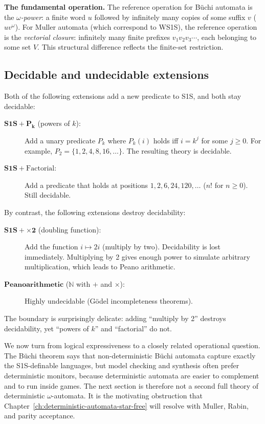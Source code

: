 \medskip\noindent
\textbf{The fundamental operation.}  The reference operation for Büchi
automata is the \emph{$\omega$-power}: a finite word $u$ followed by
infinitely many copies of some suffix $v$ ($uv^\omega$).  For Muller
automata (which correspond to WS1S), the reference operation is the
\emph{vectorial closure}: infinitely many finite prefixes $v_1 v_2 v_3
\cdots$, each belonging to some set $V$.  This structural difference
reflects the finite-set restriction.

\subsection{Decidable and undecidable extensions}

Both of the following extensions add a new predicate to S1S, and both
stay decidable:

\begin{description}
  \item[$\mathbf{S1S + P_k}$ (powers of $k$):]
        Add a unary predicate $P_k$ where $P_k(i)$ holds iff $i = k^j$
        for some $j \geq 0$.  For example, $P_2 = \{1, 2, 4, 8, 16,
        \ldots\}$.  The resulting theory is decidable.
  \item[$\mathbf{S1S + \mathrm{Factorial}}$:]
        Add a predicate that holds at positions $1, 2, 6, 24, 120, \ldots$
        ($n!$ for $n \geq 0$).  Still decidable.
\end{description}

By contrast, the following extensions destroy decidability:

\begin{description}
  \item[$\mathbf{S1S + \times 2}$ (doubling function):]
        Add the function $i \mapsto 2i$ (multiply by two).  Decidability
        is lost immediately.  Multiplying by 2 gives enough power to
        simulate arbitrary multiplication, which leads to Peano arithmetic.
  \item[$\mathbf{Peano arithmetic}$ ($\mathbb{N}$ with $+$ and $\times$):]
        Highly undecidable (Gödel incompleteness theorems).
\end{description}

The boundary is surprisingly delicate: adding ``multiply by 2'' destroys
decidability, yet ``powers of $k$'' and ``factorial'' do not.

We now turn from logical expressiveness to a closely related operational
question.  The Büchi theorem says that non-deterministic Büchi automata
capture exactly the S1S-definable languages, but model checking and
synthesis often prefer deterministic monitors, because deterministic
automata are easier to complement and to run inside games.  The next
section is therefore not a second full theory of deterministic
$\omega$-automata.  It is the motivating obstruction that
Chapter~\ref{ch:deterministic-automata-star-free} will resolve with
Muller, Rabin, and parity acceptance.

